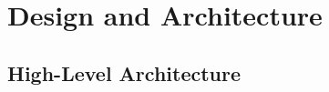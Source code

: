 \documentclass{scrreprt}
\begin{document}






\chapter{Design and Architecture}


\section{High-Level Architecture}
\end{document}
